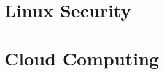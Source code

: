 










\part{Linux Security}








\part{Cloud Computing}







\appendix






\printindex


